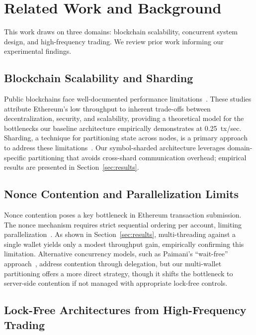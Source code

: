 \section{Related Work and Background}
\label{sec:related}

This work draws on three domains: blockchain scalability, concurrent system design, and high-frequency trading. We review prior work informing our experimental findings.

\subsection{Blockchain Scalability and Sharding}

Public blockchains face well-documented performance limitations~\cite{bez2019scalability,ucbas2023performance}. These studies attribute Ethereum's low throughput to inherent trade-offs between decentralization, security, and scalability, providing a theoretical model for the bottlenecks our baseline architecture empirically demonstrates at 0.25~tx/sec. Sharding, a technique for partitioning state across nodes, is a primary approach to address these limitations~\cite{fynn2018partitioning}. Our symbol-sharded architecture leverages domain-specific partitioning that avoids cross-shard communication overhead; empirical results are presented in Section~\ref{sec:results}.

\subsection{Nonce Contention and Parallelization Limits}

Nonce contention poses a key bottleneck in Ethereum transaction submission. The nonce mechanism requires strict sequential ordering per account, limiting parallelization~\cite{hu2023nonce}. As shown in Section~\ref{sec:results}, multi-threading against a single wallet yields only a modest throughput gain, empirically confirming this limitation. Alternative concurrency models, such as Paimani's ``wait-free'' approach~\cite{paimani2021sonicchain}, address contention through delegation, but our multi-wallet partitioning offers a more direct strategy, though it shifts the bottleneck to server-side contention if not managed with appropriate lock-free controls.

\subsection{Lock-Free Architectures from High-Frequency Trading}

